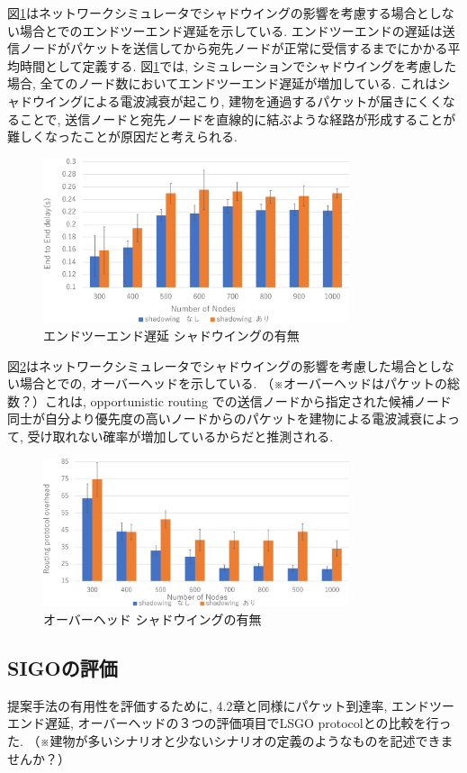 \documentclass[technicalreport]{ieicej}
\begin{document}
図\ref{fig:Delay-shadowing}はネットワークシミュレータでシャドウイングの影響を考慮する場合としない場合とでのエンドツーエンド遅延を示している. エンドツーエンドの遅延は送信ノードがパケットを送信してから宛先ノードが正常に受信するまでにかかる平均時間として定義する. 図\ref{fig:Delay-shadowing}では, シミュレーションでシャドウイングを考慮した場合, 全てのノード数においてエンドツーエンド遅延が増加している. これはシャドウイングによる電波減衰が起こり, 建物を通過するパケットが届きにくくなることで, 送信ノードと宛先ノードを直線的に結ぶような経路が形成することが難しくなったことが原因だと考えられる. 

\begin{figure}[!ht]
\centering
\includegraphics[width=90mm]{figures/Delay-shadowing.eps}
\caption{エンドツーエンド遅延 シャドウイングの有無}
\label{fig:Delay-shadowing}
\end{figure}


図\ref{fig:Overhead-shadowing}はネットワークシミュレータでシャドウイングの影響を考慮した場合としない場合とでの, オーバーヘッドを示している. （※オーバーヘッドはパケットの総数？）これは, opportunistic routing での送信ノードから指定された候補ノード同士が自分より優先度の高いノードからのパケットを建物による電波減衰によって, 受け取れない確率が増加しているからだと推測される. 


\begin{figure}[!ht]
\centering
\includegraphics[width=90mm]{figures/Overhead-shadowing.eps}
\caption{オーバーヘッド シャドウイングの有無}
\label{fig:Overhead-shadowing}
\end{figure}


\subsection{SIGOの評価}
提案手法の有用性を評価するために, 4.2章と同様にパケット到達率, エンドツーエンド遅延, オーバーヘッドの３つの評価項目でLSGO protocolとの比較を行った. （※建物が多いシナリオと少ないシナリオの定義のようなものを記述できませんか？）
\end{document}
